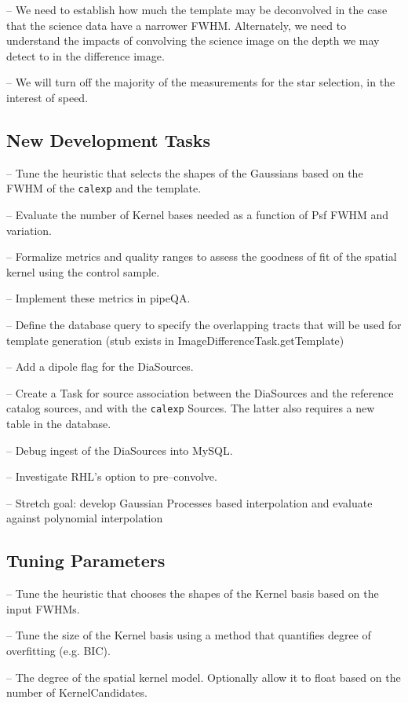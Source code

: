 \documentclass[12pt]{article}
\begin{document}
-- We need to establish how much the template may be deconvolved in
the case that the science data have a narrower FWHM.  Alternately, we
need to understand the impacts of convolving the science image on the
depth we may detect to in the difference image.

-- We will turn off the majority of the measurements for the star
selection, in the interest of speed.


\subsection{New Development Tasks}

-- Tune the heuristic that selects the shapes of the Gaussians based
on the FWHM of the {\tt calexp} and the template.

-- Evaluate the number of Kernel bases needed as a function of Psf
FWHM and variation.

-- Formalize metrics and quality ranges to assess the goodness of fit
of the spatial kernel using the control sample.

-- Implement these metrics in pipeQA.

-- Define the database query to specify the overlapping tracts that
will be used for template generation (stub exists in
ImageDifferenceTask.getTemplate)

-- Add a dipole flag for the DiaSources.

-- Create a Task for source association between the DiaSources and the
reference catalog sources, and with the {\tt calexp} Sources.  The
latter also requires a new table in the database.

-- Debug ingest of the DiaSources into MySQL.

-- Investigate RHL's option to pre--convolve.

-- Stretch goal: develop Gaussian Processes based interpolation and
evaluate against polynomial interpolation

\subsection{Tuning Parameters}

-- Tune the heuristic that chooses the shapes of the Kernel basis
based on the input FWHMs.

-- Tune the size of the Kernel basis using a method that quantifies
degree of overfitting (e.g. BIC).

-- The degree of the spatial kernel model.  Optionally allow it to
float based on the number of KernelCandidates.
\end{document}
